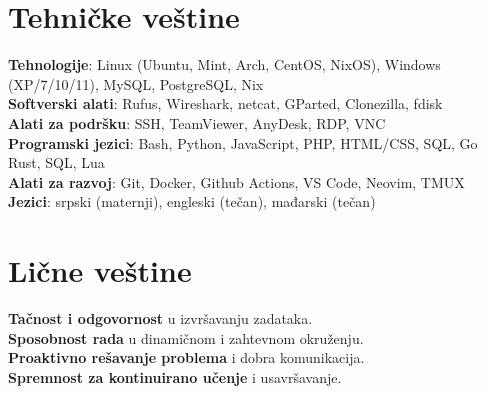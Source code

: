 \documentclass[letterpaper,11pt]{article}
\begin{document}
\section{Tehničke veštine}
 \begin{itemize}[leftmargin=0.15in, label={}]
    \small{\item{
     \textbf{Tehnologije}{: Linux (Ubuntu, Mint, Arch, CentOS, NixOS), Windows (XP/7/10/11), MySQL, PostgreSQL, Nix} \\
     \textbf{Softverski alati}{: Rufus, Wireshark, netcat, GParted, Clonezilla, fdisk} \\
     \textbf{Alati za podršku}{: SSH, TeamViewer, AnyDesk, RDP, VNC}\\
     \textbf{Programski jezici}{: Bash, Python, JavaScript, PHP, HTML/CSS, SQL, Go Rust, SQL, Lua} \\
     \textbf{Alati za razvoj}{: Git, Docker, Github Actions, VS Code, Neovim, TMUX} \\
     \textbf{Jezici}{: srpski (maternji), engleski (tečan), mađarski (tečan)}
    }}
 \end{itemize}

\section{Lične veštine}
 \begin{itemize}[leftmargin=0.15in, label={}]
    \small{\item{
     \textbf{Tačnost i odgovornost} u izvršavanju zadataka.\\
     \textbf{Sposobnost rada} u dinamičnom i zahtevnom okruženju.\\
     \textbf{Proaktivno rešavanje problema} i dobra komunikacija.\\
     \textbf{Spremnost za kontinuirano učenje} i usavršavanje.
    }}
 \end{itemize}


\end{document}
